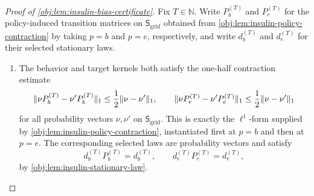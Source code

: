 \begin{proof}[Proof of \cref{obj:lem:insulin-bias-certificate}]
Fix \(T\in\mathbb N\). Write \(P_b^{(T)}\) and \(P_e^{(T)}\) for the policy-induced transition matrices on \(\mathsf S_{\mathrm{grid}}\) obtained from \cref{obj:lem:insulin-policy-contraction} by taking \(p=b\) and \(p=e\), respectively, and write \(d_b^{(T)}\) and \(d_e^{(T)}\) for their selected stationary laws.

\begin{enumerate}
\item The behavior and target kernels both satisfy the one-half contraction estimate
\[
\|\nu P_b^{(T)}-\nu'P_b^{(T)}\|_1
\le {1\over2}\|\nu-\nu'\|_1,
\qquad
\|\nu P_e^{(T)}-\nu'P_e^{(T)}\|_1
\le {1\over2}\|\nu-\nu'\|_1
\]
for all probability vectors \(\nu,\nu'\) on \(\mathsf S_{\mathrm{grid}}\). This is exactly the \(\ell^1\)-form supplied by \cref{obj:lem:insulin-policy-contraction}, instantiated first at \(p=b\) and then at \(p=e\). The corresponding selected laws are probability vectors and satisfy
\[
d_b^{(T)}P_b^{(T)}=d_b^{(T)},
\qquad
d_e^{(T)}P_e^{(T)}=d_e^{(T)},
\]
by \cref{obj:lem:insulin-stationary-law}.


\end{enumerate}
\end{proof}

